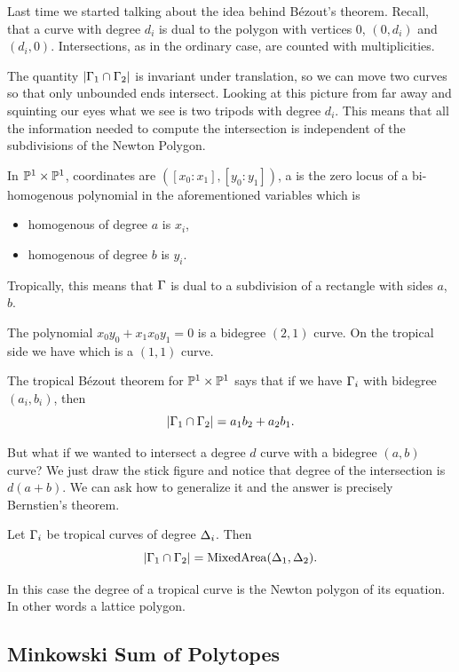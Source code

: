 \documentclass[12pt]{memoir}
\begin{document}
Last time we started talking about the idea behind Bézout's theorem. Recall, that a curve with degree $d_i$ is dual to the polygon with vertices $0$, $(0,d_i)$ and $(d_i,0)$. Intersections, as in the ordinary case, are counted with multiplicities.\par 
The quantity $|\Gamma_1\cap \Gamma_2|$ is invariant under translation, so we can move two curves so that only unbounded ends intersect. Looking at this picture from far away and squinting our eyes what we see is two tripods with degree $d_i$. This means that all the information needed to compute the intersection is independent of the subdivisions of the Newton Polygon.
\begin{Def}
    In $\mathbb{P}^1\times\mathbb{P}^1$, coordinates are $([x_0:x_1],[y_0:y_1])$, a  is the zero locus of a bi-homogenous polynomial in the aforementioned variables which is 
    \begin{itemize}
        \item homogenous of degree $a$ is $x_i$,
        \item homogenous of degree $b$ is $y_i$.
    \end{itemize}    
    Tropically, this means that $\Gamma$ is dual to a subdivision of a rectangle with sides $a$, $b$.
\end{Def}

\begin{Ex}
    The polynomial $x_0y_0+x_1x_0y_1=0$ is a bidegree $(2,1)$ curve. On the tropical side we have  which is a $(1,1)$ curve.
\end{Ex}

The tropical Bézout theorem for $\mathbb{P}^1\times\mathbb{P}^1$ says that if we have $\Gamma_i$ with bidegree $(a_i,b_i)$, then 
$$|\Gamma_1\cap\Gamma_2|=a_1b_2+a_2b_1.$$

But what if we wanted to intersect a degree $d$ curve with a bidegree $(a,b)$ curve? We just draw the stick figure and notice that degree of the intersection is $d(a+b)$. We can ask how to generalize it and the answer is precisely Bernstien's theorem.

\begin{Th}
Let $\Gamma_i$ be tropical curves of degree $\Delta_i$. Then 
$$|\Gamma_1\cap\Gamma_2|=\operatorname{MixedArea}(\Delta_1,\Delta_2).$$
\end{Th}

In this case the degree of a tropical curve is the Newton polygon of its equation. In other words a lattice polygon.

\subsection{Minkowski Sum of Polytopes}
\end{document}
